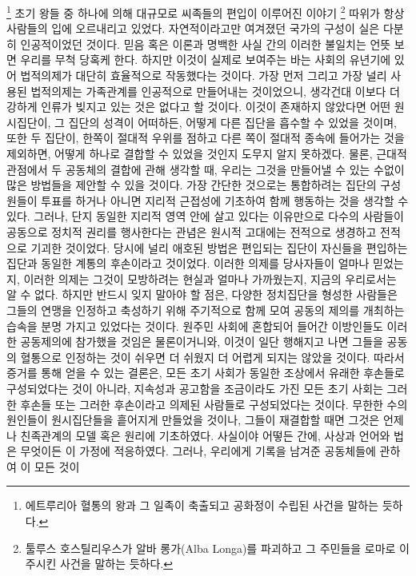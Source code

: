 \footnote{에트루리아 혈통의 왕과 그 일족이 축출되고 공화정이 수립된 사건을
말하는 듯하다.}
초기 왕들 중 하나에 의해 대규모로 씨족들의 편입이 이루어진 이야기%
\footnote{툴루스 호스틸리우스가 알바 롱가(Alba Longa)를 파괴하고
그 주민들을 로마로 이주시킨 사건을 말하는 듯하다.}
따위가 항상 사람들의 입에 오르내리고 있었다.
자연적이라고만 여겨졌던 국가의 구성이 실은 다분히 인공적이었던 것이다.
믿음 혹은 이론과 명백한 사실 간의 이러한 불일치는 언뜻 보면
우리를 무척 당혹케 한다.
하지만 이것이 실제로 보여주는 바는
사회의 유년기에 있어 법적의제가 대단히 효율적으로 작동했다는 것이다.
가장 먼저 그리고 가장 널리 사용된 법적의제는
가족관계를 인공적으로 만들어내는 것이었으니,
생각건대 이보다 더 강하게 인류가 빚지고 있는 것은 없다고 할 것이다.
이것이 존재하지 않았다면
어떤 원시집단이, 그 집단의 성격이 어떠하든,
어떻게 다른 집단을 흡수할 수 있었을 것이며,
또한 두 집단이,
한쪽이 절대적 우위를 점하고 다른 쪽이 절대적 종속에 들어가는 것을 제외하면,
어떻게 하나로 결합할 수 있었을 것인지
도무지 알지 못하겠다.
물론,
근대적 관점에서 두 공동체의 결합에 관해 생각할 때,
우리는 그것을 만들어낼 수 있는 수없이 많은 방법들을 제안할 수 있을 것이다.
가장 간단한 것으로는 통합하려는 집단의 구성원들이 투표를 하거나
아니면 지리적 근접성에 기초하여 함께 행동하는 것을 생각할 수 있다.
그러나,
단지 동일한 지리적 영역 안에 살고 있다는 이유만으로
다수의 사람들이 공동으로 정치적 권리를 행사한다는
관념은 원시적 고대에는 전적으로 생경하고 전적으로 기괴한 것이었다.
당시에 널리 애호된 방법은
편입되는 집단이 자신들을 편입하는 집단과 동일한 계통의 후손이라고
 것이었다.
이러한 의제를 당사자들이 얼마나 믿었는지,
이러한 의제는 그것이 모방하려는 현실과 얼마나 가까웠는지,
지금의 우리로서는 알 수 없다.
하지만 반드시 잊지 말아야 할 점은,
다양한 정치집단을 형성한 사람들은
그들의 연맹을 인정하고 축성하기 위해
주기적으로 함께 모여
공동의 제의를 개최하는 습속을
분명 가지고 있었다는 것이다.
원주민 사회에 혼합되어 들어간 이방인들도 이러한 공동제의에 참가했을
것임은 물론이거니와,
이것이 일단 행해지고 나면 그들을 공동의 혈통으로 인정하는 것이
쉬우면 더 쉬웠지 더 어렵게 되지는 않았을 것이다.
따라서 증거를 통해 얻을 수 있는 결론은,
모든 초기 사회가 동일한 조상에서 유래한 후손들로 구성되었다는 것이 아니라,
지속성과 공고함을 조금이라도 가진 모든 초기 사회는 그러한 후손들 또는
그러한 후손이라고 의제된 사람들로 구성되었다는 것이다.
무한한 수의 원인들이 원시집단들을 흩어지게 만들었을 것이나,
그들이 재결합할 때면 그것은 언제나 친족관계의 모델 혹은 원리에
기초하였다.
사실이야 어떻든 간에, 사상과 언어와 법은 무엇이든 이 가정에 적응하였다.
그러나,
우리에게 기록을 남겨준 공동체들에 관하여
이 모든 것이

